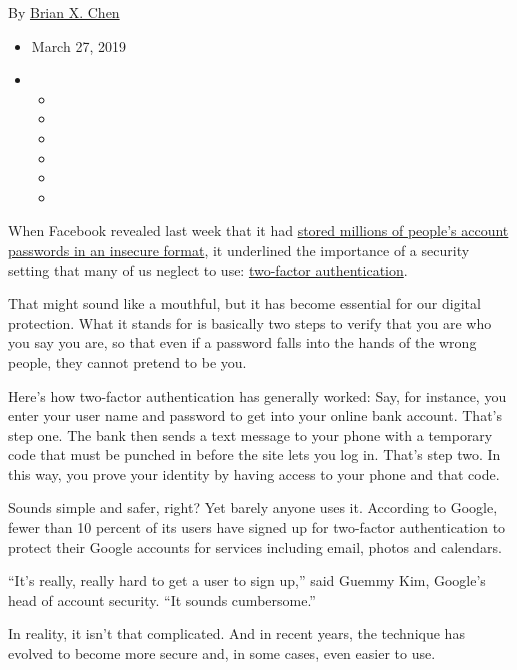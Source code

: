 By \href{https://www.nytimes.com/by/brian-x-chen}{Brian X. Chen}

\begin{itemize}
\item
  March 27, 2019
\item
  \begin{itemize}
  \item
  \item
  \item
  \item
  \item
  \item
  \end{itemize}
\end{itemize}

When Facebook revealed last week that it had
\href{https://www.nytimes.com/2019/03/21/technology/personaltech/facebook-passwords.html}{stored
millions of people's account passwords in an insecure format}, it
underlined the importance of a security setting that many of us neglect
to use:
\href{https://www.nytimes.com/2017/08/08/technology/personaltech/protecting-your-accounts-by-text-or-app.html?module=inline}{two-factor
authentication}.

That might sound like a mouthful, but it has become essential for our
digital protection. What it stands for is basically two steps to verify
that you are who you say you are, so that even if a password falls into
the hands of the wrong people, they cannot pretend to be you.

Here's how two-factor authentication has generally worked: Say, for
instance, you enter your user name and password to get into your online
bank account. That's step one. The bank then sends a text message to
your phone with a temporary code that must be punched in before the site
lets you log in. That's step two. In this way, you prove your identity
by having access to your phone and that code.

Sounds simple and safer, right? Yet barely anyone uses it. According to
Google, fewer than 10 percent of its users have signed up for two-factor
authentication to protect their Google accounts for services including
email, photos and calendars.

``It's really, really hard to get a user to sign up,'' said Guemmy Kim,
Google's head of account security. ``It sounds cumbersome.''

In reality, it isn't that complicated. And in recent years, the
technique has evolved to become more secure and, in some cases, even
easier to use.

